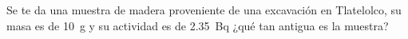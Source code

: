 \documentclass[./../main.tex]{subfiles}
\begin{document}
	\begin{exercise}
		Se te da una muestra de madera proveniente de una excavación en Tlatelolco, su masa es de \qty{10}{\g} y su actividad es de \qty{2.35}{\becquerel} ¿qué tan antigua es la muestra?
	\end{exercise}
\end{document}
